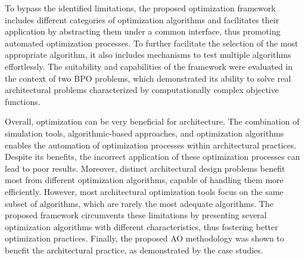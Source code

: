To bypass the identified limitations, the proposed optimization framework includes different categories of optimization algorithms and facilitates their application by abstracting them under a common interface, thus promoting automated optimization processes. To further facilitate the selection of the most appropriate algorithm, it also includes mechanisms to test multiple algorithms effortlessly. The suitability and capabilities of the framework were evaluated in the context of two \ac{BPO} problems, which demonstrated its ability to solve real architectural problems characterized by computationally complex objective functions.

Overall, optimization can be very beneficial for architecture. The combination of simulation tools, algorithmic-based approaches, and optimization algorithms enables the automation of optimization processes within architectural practices. Despite its benefits, the incorrect application of these optimization processes can lead to poor results. Moreover, distinct architectural design problems benefit most from different optimization algorithms, capable of handling them more efficiently. However, most architectural optimization tools focus on the same subset of algorithms, which are rarely the most adequate algorithms. The proposed framework circumvents these limitations by presenting several optimization algorithms with different characteristics, thus fostering better optimization practices. Finally, the proposed \ac{AO} methodology was shown to benefit the architectural practice, as demonstrated by the case studies.